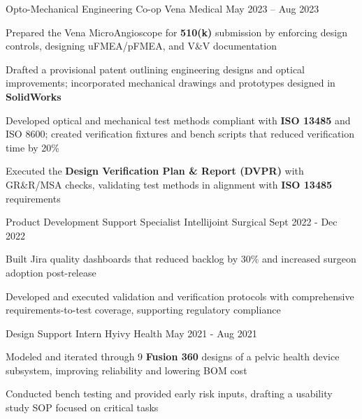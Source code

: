 \documentclass[11pt, a4paper]{russell}
\begin{document}
\begin{cventries}
\cventry
  {Opto-Mechanical Engineering Co-op} %
  {Vena Medical} %
  {} %
  {May 2023 -- Aug 2023} %
  {
    \begin{cvitems}
        \item {Prepared the Vena MicroAngioscope for \textbf{510(k)} submission by enforcing design controls, designing uFMEA/pFMEA, and V\&V documentation}
        \item {Drafted a provisional patent outlining engineering designs and optical improvements; incorporated mechanical drawings and prototypes designed in \textbf{SolidWorks}}
        \item {Developed optical and mechanical test methods compliant with \textbf{ISO 13485} and ISO 8600; created verification fixtures and bench scripts that reduced verification time by 20\%}
        \item {Executed the \textbf{Design Verification Plan \& Report (DVPR)} with GR\&R/MSA checks, validating test methods in alignment with \textbf{ISO 13485} requirements}
    \end{cvitems}
  }

\cventry
  {Product Development Support Specialist} %
  {Intellijoint Surgical} %
  {} %
  {Sept 2022 - Dec 2022} %
  {
    \begin{cvitems}
        \item {Built Jira quality dashboards that reduced backlog by 30\% and increased surgeon adoption post-release}
        \item {Developed and executed validation and verification protocols with comprehensive requirements-to-test coverage, supporting regulatory compliance}
    \end{cvitems}
  }

\cventry
  {Design Support Intern} %
  {Hyivy Health} %
  {} %
  {May 2021 - Aug 2021} %
  {
    \begin{cvitems}
        \item {Modeled and iterated through 9 \textbf{Fusion 360} designs of a pelvic health device subsystem, improving reliability and lowering BOM cost}
        \item {Conducted bench testing and provided early risk inputs, drafting a usability study SOP focused on critical tasks}
    \end{cvitems}
  }
\end{cventries}
\end{document}
